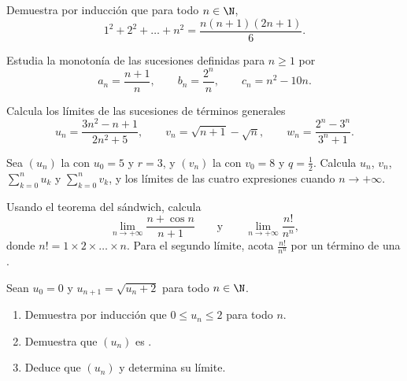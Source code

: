 \begin{exercise}[$\star$]\label{exo:g12:seq:1}
Demuestra por inducción que para todo $n \in \N$,
\[
1^2 + 2^2 + \dots + n^2 = \frac{n(n+1)(2n+1)}{6}.
\]
\end{exercise}

\begin{exercise}[$\star$]\label{exo:g12:seq:2}
Estudia la monotonía de las sucesiones definidas para $n \geq 1$ por
\[
a_n = \frac{n+1}{n}, \qquad
b_n = \frac{2^n}{n}, \qquad
c_n = n^2 - 10n .
\]
\end{exercise}

\begin{exercise}[$\star$]\label{exo:g12:seq:3}
Calcula los límites de las sucesiones de términos generales
\[
u_n = \frac{3n^2 - n + 1}{2n^2 + 5}, \qquad
v_n = \sqrt{n+1} - \sqrt{n}, \qquad
w_n = \frac{2^n - 3^n}{3^n + 1}.
\]
\end{exercise}

\begin{exercise}[$\star$]\label{exo:g12:seq:4}
Sea $(u_n)$ la  con $u_0 = 5$ y  $r = 3$, y
$(v_n)$ la  con $v_0 = 8$ y  $q = \frac{1}{2}$.
Calcula $u_n$, $v_n$, $\sum_{k=0}^{n} u_k$ y $\sum_{k=0}^{n} v_k$, y los
límites de las cuatro expresiones cuando $n \to +\infty$.
\end{exercise}

\begin{exercise}[$\star\star$]\label{exo:g12:seq:5}
Usando el teorema del sándwich, calcula
\[
\lim_{n\to+\infty} \frac{n + \cos n}{n + 1}
\qquad\text{y}\qquad
\lim_{n\to+\infty} \frac{n!}{n^n},
\]
donde $n! = 1 \times 2 \times \dots \times n$. Para el segundo límite,
acota $\frac{n!}{n^n}$ por un término de una .
\end{exercise}

\begin{exercise}[$\star\star$]\label{exo:g12:seq:6}
Sean $u_0 = 0$ y $u_{n+1} = \sqrt{u_n + 2}$ para todo $n \in \N$.
\begin{enumerate}
  \item Demuestra por inducción que $0 \leq u_n \leq 2$ para todo $n$.
  \item Demuestra que $(u_n)$ es .
  \item Deduce que $(u_n)$  y determina su límite.
\end{enumerate}
\end{exercise}

